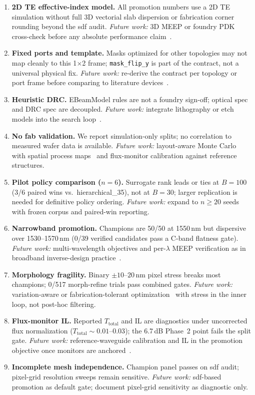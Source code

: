 \documentclass[11pt,a4paper]{article}
\begin{document}
\begin{enumerate}
  \item \textbf{2D TE effective-index model.} All promotion numbers use a 2D TE simulation without full 3D vectorial slab dispersion or fabrication corner rounding beyond the sdf audit.
  \emph{Future work:} 3D MEEP or foundry PDK cross-check before any absolute performance claim~\cite{Hansen2024BroadbandSplitters}.
  \item \textbf{Fixed ports and template.} Masks optimized for other topologies may not map cleanly to this 1$\times$2 frame; \texttt{mask\_flip\_y} is part of the contract, not a universal physical fix.
  \emph{Future work:} re-derive the contract per topology or port frame before comparing to literature devices~\cite{Piggott2017InverseDesign}.
  \item \textbf{Heuristic DRC.} EBeamModel rules are not a foundry sign-off; optical spec and DRC spec are decoupled.
  \emph{Future work:} integrate lithography or etch models into the search loop~\cite{Faid2024FabricationAware,Schubert2022CevicheChallenges}.
  \item \textbf{No fab validation.} We report simulation-only splits; no correlation to measured wafer data is available.
  \emph{Future work:} layout-aware Monte Carlo with spatial process maps~\cite{Xing2023SpatialVariation} and flux-monitor calibration against reference structures.
  \item \textbf{Pilot policy comparison ($n{=}6$).} Surrogate rank leads or ties at $B{=}100$ (3/6 paired wins vs.\ hierarchical\_35), not at $B{=}30$; larger replication is needed for definitive policy ordering.
  \emph{Future work:} expand to $n{\ge}20$ seeds with frozen corpus and paired-win reporting.
  \item \textbf{Narrowband promotion.} Champions are 50/50 at 1550\,nm but dispersive over 1530--1570\,nm (0/39 verified candidates pass a C-band flatness gate).
  \emph{Future work:} multi-wavelength objectives and per-$\lambda$ MEEP verification as in broadband inverse-design practice~\cite{Hansen2024BroadbandSplitters,Piggott2017FabricationConstrained}.
  \item \textbf{Morphology fragility.} Binary $\pm 10$--$20$\,nm pixel stress breaks most champions; 0/517 morph-refine trials pass combined gates.
  \emph{Future work:} variation-aware or fabrication-tolerant optimization~\cite{Piggott2017FabricationConstrained,BOSON2024,Wolff2024FabricationTolerant} with stress in the inner loop, not post-hoc filtering.
  \item \textbf{Flux-monitor IL.} Reported $T_{\mathrm{total}}$ and IL are diagnostics under uncorrected flux normalization ($T_{\mathrm{total}}\sim 0.01$--$0.03$); the 6.7\,dB Phase~2 point fails the split gate.
  \emph{Future work:} reference-waveguide calibration and IL in the promotion objective once monitors are anchored~\cite{Xing2023SpatialVariation,Hughes2018AdjointNonlinear}.
  \item \textbf{Incomplete mesh independence.} Champion panel passes on sdf audit; pixel-grid resolution sweeps remain sensitive.
  \emph{Future work:} sdf-based promotion as default gate; document pixel-grid sensitivity as diagnostic only.
\end{enumerate}
\end{document}
